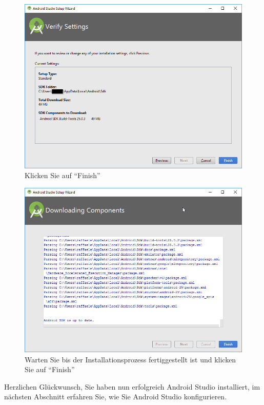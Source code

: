 \documentclass[a4paper,10pt,xetex]{article}
\begin{document}
\begin{figure}
  \centering
  \includegraphics[width=\textwidth]{Installation/1-13}
  \caption{Klicken Sie auf ``Finish''}
\end{figure}

\begin{figure}
  \centering
  \includegraphics[width=\textwidth]{Installation/1-15}
  \caption{Warten Sie bis der Installationsprozess fertiggestellt ist und klicken Sie auf ``Finish''}
\end{figure}

Herzlichen Glückwunsch, Sie haben nun erfolgreich Android Studio installiert, im nächsten Abschnitt erfahren Sie, wie Sie Android Studio konfigurieren.
\end{document}
